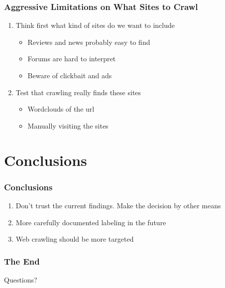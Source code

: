 \documentclass[10pt]{beamer}
\begin{document}
\begin{frame}
\frametitle{Aggressive Limitations on What Sites to Crawl}

\begin{enumerate}
    \item Think first what kind of sites do we want to include
    \begin{itemize}
        \item Reviews and news probably easy to find
        \pause
        \item Forums are hard to interpret
        \pause
        \item Beware of clickbait and ads
    \end{itemize}
    \pause
    \item Test that crawling really finds these sites
    \begin{itemize}
        \item Wordclouds of the url
        \pause
        \item Manually visiting the sites
    \end{itemize}
\end{enumerate}

\end{frame}

\section{Conclusions}

\begin{frame}
\frametitle{Conclusions}

\begin{enumerate}
    \item Don't trust the current findings. Make the decision by other means
    \pause
    \item More carefully documented labeling in the future
    \pause
    \item Web crawling should be more targeted
\end{enumerate}

\end{frame}

\begin{frame}
\frametitle{The End}

\LARGE{\centerline{Questions?}}

\end{frame}

\end{document}
